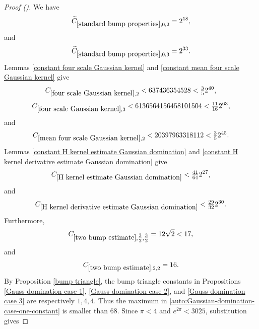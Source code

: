 \documentclass[12pt,reqno]{amsart}
\newcommand{\auto}{{({\tiny\faCar})}}
\theoremstyle{plain}
\numberwithin{equation}{section}
\theoremstyle{remark}
\begin{document}
\begin{proof}[Proof \auto]
We have
\begin{equation}\label{auto:standard-bump-small-constants-for-Gaussian-domination}
\widetilde C_{\ref{standard bump properties},0,2}=2^{18},
\end{equation}
and
\begin{equation}\label{auto:standard-bump-small-constant-three-for-Gaussian-domination}
\widetilde C_{\ref{standard bump properties},0,3}=2^{33}.
\end{equation}
Lemmas \ref{constant four scale Gaussian kernel} and \ref{constant mean four scale Gaussian kernel} give
\begin{equation}\label{auto:four-scale-small-constant-two-for-Gaussian-domination}
C_{\ref{four scale Gaussian kernel},2}<637436354528<\tfrac35 2^{40},
\end{equation}
\begin{equation}\label{auto:four-scale-small-constant-three-for-Gaussian-domination}
C_{\ref{four scale Gaussian kernel},3}<6136564156458101504<\tfrac{11}{16}2^{63},
\end{equation}
and
\begin{equation}\label{auto:mean-four-scale-small-constant-two-for-Gaussian-domination}
C_{\ref{mean four scale Gaussian kernel},2}<20397963318112<\tfrac35 2^{45}.
\end{equation}
Lemmas \ref{constant H kernel estimate Gaussian domination} and \ref{constant H kernel derivative estimate Gaussian domination} give
\begin{equation}\label{auto:H-kernel-small-constant-for-Gaussian-domination}
C_{\ref{H kernel estimate Gaussian domination}}<\tfrac{41}{64}2^{27},
\end{equation}
and
\begin{equation}\label{auto:H-kernel-derivative-small-constant-for-Gaussian-domination}
C_{\ref{H kernel derivative estimate Gaussian domination}}<\tfrac{29}{32}2^{30}.
\end{equation}
Furthermore,
\begin{equation}\label{auto:two-bump-small-constant-three-halves-for-Gaussian-domination}
C_{\ref{two bump estimate},\tfrac32,\tfrac32}=12\sqrt2<17,
\end{equation}
and
\begin{equation}\label{auto:two-bump-small-constant-two-for-Gaussian-domination}
C_{\ref{two bump estimate},2,2}=16.
\end{equation}
By Proposition \ref{bump triangle}, the bump triangle constants in Propositions \ref{Gauss domination case 1}, \ref{Gauss domination case 2}, and \ref{Gauss domination case 3} are respectively $1,4,4$. Thus the maximum in \eqref{auto:Gaussian-domination-case-one-constant} is smaller than $68$. Since $\pi<4$ and $e^{2\pi}<3025$, substitution gives

\end{proof}
\end{document}
